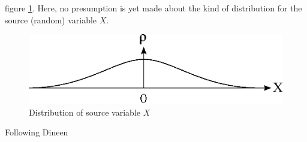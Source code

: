 figure \ref{fig:gaussian}. Here, no presumption is yet made about the kind of distribution for the source (random) variable $X$. 

\begin{figure}
  \centering
  \includegraphics{Images/gaussian.eps}
  \caption[Distribution of source variable $X$]
          {Distribution of source variable $X$}
  \label{fig:gaussian}
\end{figure}

Following Dineen \cite{dineen00}
